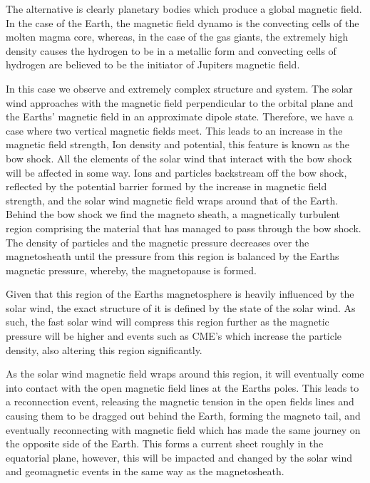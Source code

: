 The alternative is clearly planetary bodies which produce a global magnetic field.
In the case of the Earth, the magnetic field dynamo is the convecting cells of the molten magma core, whereas, in the case of the gas giants, the extremely high density causes the hydrogen to be in a metallic form and convecting cells of hydrogen are believed to be the initiator of Jupiters magnetic field.

In this case we observe and extremely complex structure and system.
The solar wind approaches with the magnetic field perpendicular to the orbital plane and the Earths' magnetic field in an approximate dipole state.
Therefore, we have a case where two vertical magnetic fields meet.
This leads to an increase in the magnetic field strength, Ion density and potential, this feature is known as the bow shock.
All the elements of the solar wind that interact with the bow shock will be affected in some way.
Ions and particles backstream off the bow shock, reflected by the potential barrier formed by the increase in magnetic field strength, and the solar wind magnetic field wraps around that of the Earth.
Behind the bow shock we find the magneto sheath, a magnetically turbulent region comprising the 
material that has managed to pass through the bow shock.
The density of particles and the magnetic pressure decreases over the magnetosheath until the pressure from this region is balanced by the Earths magnetic pressure, whereby, the magnetopause is formed.

Given that this region of the Earths magnetosphere is heavily influenced by the solar wind, the exact structure of it is defined by the state of the solar wind.
As such, the fast solar wind will compress this region further as the magnetic pressure will be higher and events such as CME's which increase the particle density, also altering this region significantly.

As the solar wind magnetic field wraps around this region, it will eventually come into contact with the open magnetic field lines at the Earths poles.
This leads to a reconnection event, releasing the magnetic tension in the open fields lines and causing them to be dragged out behind the Earth, forming the magneto tail, and eventually reconnecting with magnetic field which has made the same journey on the opposite side of the Earth. 
This forms a current sheet roughly in the equatorial plane, however, this will be impacted and changed by the solar wind and geomagnetic events in the same way as the magnetosheath.

